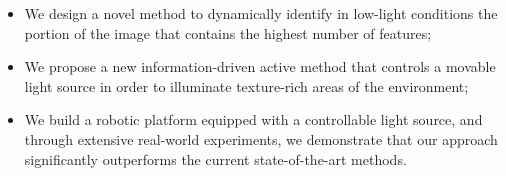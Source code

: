 \begin{itemize}
    \item We design a novel method to dynamically identify in low-light conditions the portion of the image that contains the highest number of features;
    \item We propose a new information-driven active method that controls a movable light source in order to illuminate texture-rich areas of the environment;
    \item We build a robotic platform equipped with a controllable light source, and through extensive real-world experiments, we demonstrate that our approach significantly outperforms the current state-of-the-art methods.
\end{itemize}